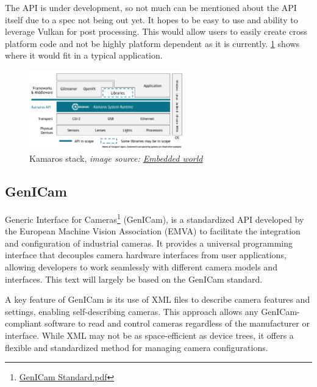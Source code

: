 The API is under development, so not much can be mentioned about the API itself
due to a spec not being out yet. It hopes to be easy to use and ability to
leverage Vulkan for post processing. This would allow users to easily create
cross platform code and not be highly platform dependent as it is currently.
\cref{fig:kamaros_stack} shows where it would fit in a typical application.

\begin{figure}
    \begin{center}
        \includegraphics[width=0.60\textwidth]{figures/kamaros_stack.png}
    \end{center}
    \caption[Kamaros stack]{Kamaros stack, \textit{image source: \href{https://www.khronos.org/assets/uploads/developers/presentations/Khronos\_Kamaros\_Embedded\_World\_Mar23.pdf}{Embedded world}}}\label{fig:kamaros_stack}
\end{figure}

\subsection {GenICam}
Generic Interface for Cameras\footnote{\href{https://www.emva.org/wp-content/uploads/GenICam\_Standard\_v2\_1\_1.pdf}{GenICam Standard.pdf}} (GenICam),
is a standardized API developed by the European Machine Vision Association
(EMVA) to facilitate the integration and configuration of industrial cameras.
It provides a universal programming interface that decouples camera hardware
interfaces from user applications, allowing developers to work seamlessly with
different camera models and interfaces. This text will largely be based on the
GenICam standard.

A key feature of GenICam is its use of XML files to describe camera features
and settings, enabling self-describing cameras. This approach allows any
GenICam-compliant software to read and control cameras regardless of the
manufacturer or interface. While XML may not be as space-efficient as device
trees, it offers a flexible and standardized method for managing camera
configurations.

